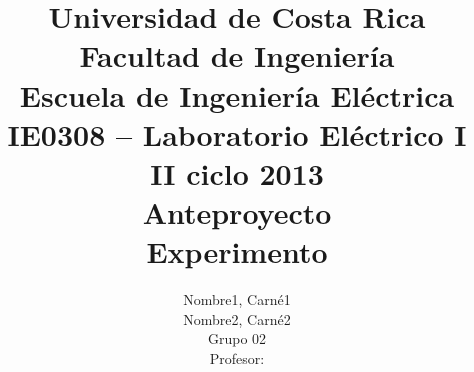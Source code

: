 \documentclass{article}
\begin{document}
\chead{}


\author{Nombre1, Carné1 \\ Nombre2, Carné2 \\ {\small Grupo 02}\\ Profesor:  \vspace*{3.0in}}
\title{Universidad de Costa Rica\\{\small Facultad de Ingeniería\\Escuela de Ingeniería Eléctrica\\IE0308 – Laboratorio Eléctrico I\\II ciclo 2013\\\vspace*{0.55in} Anteproyecto}\\ Experimento \vspace*{1.35in}}
\end{document}
